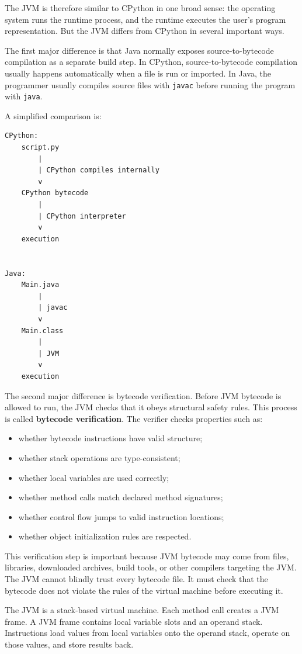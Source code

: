 The JVM is therefore similar to CPython in one broad sense: the operating system runs the runtime process, and the runtime executes the user's program representation. But the JVM differs from CPython in several important ways.

The first major difference is that Java normally exposes source-to-bytecode compilation as a separate build step. In CPython, source-to-bytecode compilation usually happens automatically when a file is run or imported. In Java, the programmer usually compiles source files with \texttt{javac} before running the program with \texttt{java}.

A simplified comparison is:

\begin{verbatim}
CPython:
    script.py
        |
        | CPython compiles internally
        v
    CPython bytecode
        |
        | CPython interpreter
        v
    execution


Java:
    Main.java
        |
        | javac
        v
    Main.class
        |
        | JVM
        v
    execution
\end{verbatim}

The second major difference is bytecode verification. Before JVM bytecode is allowed to run, the JVM checks that it obeys structural safety rules. This process is called \textbf{bytecode verification}. The verifier checks properties such as:

\begin{itemize}
    \item whether bytecode instructions have valid structure;
    \item whether stack operations are type-consistent;
    \item whether local variables are used correctly;
    \item whether method calls match declared method signatures;
    \item whether control flow jumps to valid instruction locations;
    \item whether object initialization rules are respected.
\end{itemize}

This verification step is important because JVM bytecode may come from files, libraries, downloaded archives, build tools, or other compilers targeting the JVM. The JVM cannot blindly trust every bytecode file. It must check that the bytecode does not violate the rules of the virtual machine before executing it.

The JVM is a stack-based virtual machine. Each method call creates a JVM frame. A JVM frame contains local variable slots and an operand stack. Instructions load values from local variables onto the operand stack, operate on those values, and store results back.

